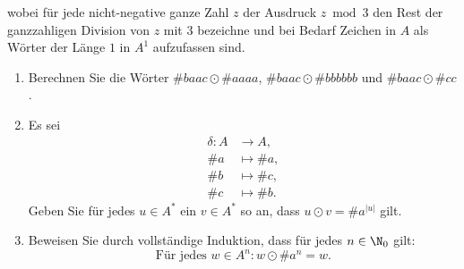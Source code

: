 \documentclass[12pt]{article}
\begin{document}
\begin{aufgabe}[1,5 + 1,5 + 3 = 6]
  wobei für jede nicht-negative ganze Zahl $z$ der Ausdruck $z \bmod 3$ den
  Rest der ganzzahligen Division von $z$ mit $3$ bezeichne und bei Bedarf
  Zeichen in $A$ als Wörter der Länge $1$ in $A^1$ aufzufassen sind.
  \begin{enumerate}
    \item Berechnen Sie die Wörter $\#{baac} \odot \#{aaaa}$,
          $\#{baac} \odot \#{bbbbbb}$ und $\#{baac} \odot \#{cc}$.
    \item Es sei
          \begin{align*}
            \delta \colon A &\to     A,\\
                        \#a &\mapsto \#a,\\
                        \#b &\mapsto \#c,\\
                        \#c &\mapsto \#b.
          \end{align*}
          Geben Sie für jedes $u \in A^*$ ein $v \in A^*$ so an, dass
          $u \odot v = \#a^{|u|}$ gilt.
    \item Beweisen Sie durch vollständige Induktion, dass für jedes
          $n \in \N_0$ gilt:
          \begin{equation*}
            \text{Für jedes } w \in A^n \colon w \odot \#a^n = w.
          \end{equation*}
  \end{enumerate}
\end{aufgabe}

\end{document}
